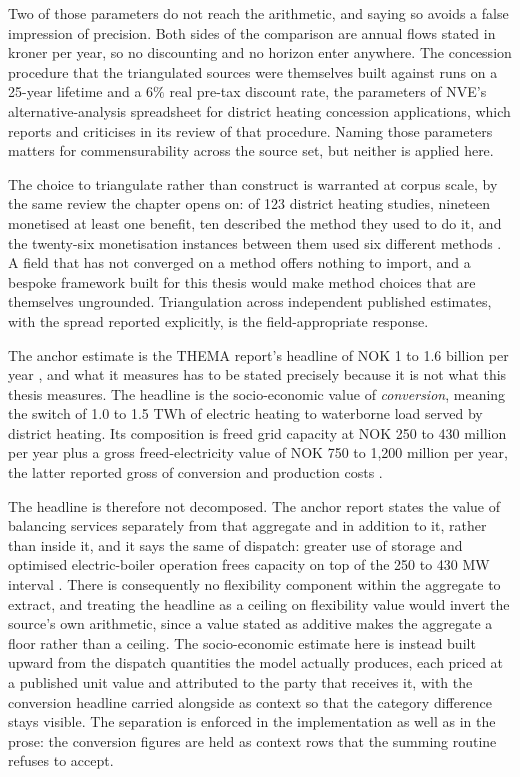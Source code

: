 Two of those parameters do not reach the arithmetic, and saying so avoids a false impression of precision. Both sides of the comparison are annual flows stated in kroner per year, so no discounting and no horizon enter anywhere. The concession procedure that the triangulated sources were themselves built against runs on a 25-year lifetime and a $6\%$ real pre-tax discount rate, the parameters of NVE's alternative-analysis spreadsheet for district heating concession applications, which \cite{Thema_fjernvarme_2024} reports and criticises in its review of that procedure. Naming those parameters matters for commensurability across the source set, but neither is applied here.

The choice to triangulate rather than construct is warranted at corpus scale, by the same review the chapter opens on: of 123 district heating studies, nineteen monetised at least one benefit, ten described the method they used to do it, and the twenty-six monetisation instances between them used six different methods \cite{ahmed_district_2025}. A field that has not converged on a method offers nothing to import, and a bespoke framework built for this thesis would make method choices that are themselves ungrounded. Triangulation across independent published estimates, with the spread reported explicitly, is the field-appropriate response.

The anchor estimate is the THEMA report's headline of NOK 1 to 1.6 billion per year \cite{Thema_fjernvarme_2024}, and what it measures has to be stated precisely because it is not what this thesis measures. The headline is the socio-economic value of \emph{conversion}, meaning the switch of 1.0 to 1.5 TWh of electric heating to waterborne load served by district heating. Its composition is freed grid capacity at NOK 250 to 430 million per year plus a gross freed-electricity value of NOK 750 to 1,200 million per year, the latter reported gross of conversion and production costs \cite{Thema_fjernvarme_2024}.

The headline is therefore not decomposed. The anchor report states the value of balancing services separately from that aggregate and in addition to it, rather than inside it, and it says the same of dispatch: greater use of storage and optimised electric-boiler operation frees capacity on top of the 250 to 430 MW interval \cite{Thema_fjernvarme_2024}. There is consequently no flexibility component within the aggregate to extract, and treating the headline as a ceiling on flexibility value would invert the source's own arithmetic, since a value stated as additive makes the aggregate a floor rather than a ceiling. The socio-economic estimate here is instead built upward from the dispatch quantities the model actually produces, each priced at a published unit value and attributed to the party that receives it, with the conversion headline carried alongside as context so that the category difference stays visible. The separation is enforced in the implementation as well as in the prose: the conversion figures are held as context rows that the summing routine refuses to accept.

